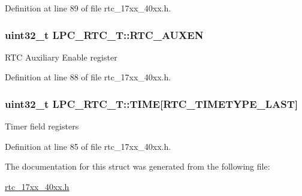 Definition at line 89 of file rtc\+\_\+17xx\+\_\+40xx.\+h.

\subsubsection[{\texorpdfstring{R\+T\+C\+\_\+\+A\+U\+X\+EN}{RTC_AUXEN}}]{ uint32\+\_\+t L\+P\+C\+\_\+\+R\+T\+C\+\_\+\+T\+::\+R\+T\+C\+\_\+\+A\+U\+X\+EN}\hypertarget{structLPC__RTC__T_af65651a26ceb3d710ccdba8f762a649f}{}\label{structLPC__RTC__T_af65651a26ceb3d710ccdba8f762a649f}
R\+TC Auxiliary Enable register 

Definition at line 88 of file rtc\+\_\+17xx\+\_\+40xx.\+h.

\subsubsection[{\texorpdfstring{T\+I\+ME}{TIME}}]{ uint32\+\_\+t L\+P\+C\+\_\+\+R\+T\+C\+\_\+\+T\+::\+T\+I\+ME\mbox{[}{\bf R\+T\+C\+\_\+\+T\+I\+M\+E\+T\+Y\+P\+E\+\_\+\+L\+A\+ST}\mbox{]}}\hypertarget{structLPC__RTC__T_adb4fbf67e8231188ed424c3ce226919e}{}\label{structLPC__RTC__T_adb4fbf67e8231188ed424c3ce226919e}
Timer field registers 

Definition at line 85 of file rtc\+\_\+17xx\+\_\+40xx.\+h.



The documentation for this struct was generated from the following file\+:\begin{DoxyCompactItemize}
\item 
\hyperlink{rtc__17xx__40xx_8h}{rtc\+\_\+17xx\+\_\+40xx.\+h}\end{DoxyCompactItemize}
